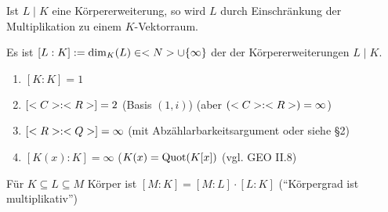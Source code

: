 \begin{remark}
	Ist $L\mid K$ eine Körpererweiterung, so wird $L$ durch Einschränkung der Multiplikation zu einem $K$-Vektorraum.
\end{remark}

\begin{definition}[Körpergrad]
	Es ist $[L:K]:= \dim_K(L) \in <N> \cup \{\infty\}$ der  der Körpererweiterungen $L\mid K$.
\end{definition}

\begin{example}
	\begin{enumerate}[label=(\alph*)]
		\item $[K: K] = 1$
		\item $[<C>:<R>] = 2$ (Basis $(1,i)$) (aber $(<C>:<R>) = \infty$)
		\item $[<R>:<Q>] = \infty$ (mit Abzählarbarkeitsargument oder siehe §2) %
		\item $[K(x):K] = \infty$ ($K(x) = \operatorname{Quot}(K[x])$ (vgl. GEO II.8)
	\end{enumerate}
\end{example}

\begin{proposition}
	Für $K \subseteq L \subseteq M$ Körper ist $[M:K] = [M:L]\cdot [L:K]$ \hspace*{1.5em} (``Körpergrad ist multiplikativ'')
\end{proposition}

